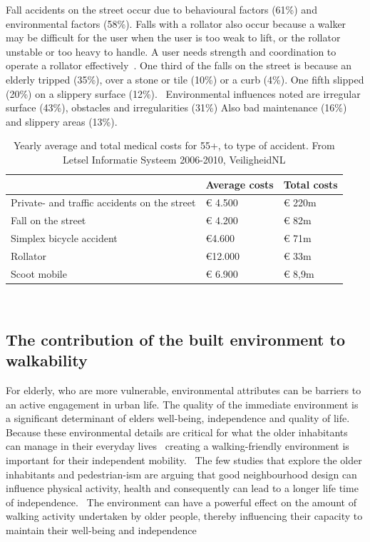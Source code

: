 Fall accidents on the street occur due to behavioural factors (61\%) and environmental factors (58\%). Falls with a rollator also occur because a walker may be difficult for the user when the user is too weak to lift, or the rollator unstable or too heavy to handle. A user needs strength and coordination to operate a rollator effectively~\cite{Einbinder2010, Weiss2014}. One third of the falls on the street is because an elderly tripped (35\%), over a stone or tile (10\%) or a curb (4\%). One fifth slipped (20\%) on a slippery surface (12\%).~\cite{VeiligheidNL2012} 
Environmental influences noted are irregular surface (43\%), obstacles and irregularities (31\%) Also bad maintenance (16\%) and slippery areas (13\%).~\cite{VeiligheidNL2012} 

\renewcommand{\arraystretch}{1.5}
\renewcommand{\tabcolsep}{0.2cm}
\begin{table}[!hbp]
\caption{Yearly average and total medical costs for 55+, to type of accident. From Letsel Informatie Systeem 2006-2010, VeiligheidNL \label{costsaccident} }
\centering
\begin{tabular}{|l|l|l|} 
\hline 
& Average costs & Total costs \\
\hline
Private- and traffic accidents on the street & \euro{} 4.500 & \euro{} 220m \\
Fall on the street & \euro{} 4.200 & \euro{} 82m \\
Simplex bicycle accident & \euro{}4.600 & \euro{} 71m \\ 
Rollator & \euro{}12.000 & \euro{} 33m\\ 
Scoot mobile & \euro{} 6.900 & \euro{} 8,9m \\
\hline
\end{tabular}
~\cite{DenHertog2013}
\end{table}


\subsection{The contribution of the built environment to walkability}
For elderly, who are more vulnerable, environmental attributes can be barriers to an active engagement in urban life. The quality of the immediate environment is a significant determinant of elders well-being, independence and quality of life.~\cite{Vine2012} Because these environmental details are critical for what the older inhabitants can manage in their everyday lives~\cite{Stahl2013, Stahl2008, Clarke2011, Annear2014} creating a walking-friendly environment is important for their independent mobility.~\cite{Sauter2010} The few studies that explore the older inhabitants and pedestrian-ism are arguing that good neighbourhood design can influence physical activity, health and consequently can lead to a longer life time of independence.~\cite{Vine2012, Rantakokko2009, Phillips2013, Beard2009, Rosso2011, Clarke2011}
The environment can have a powerful effect on the amount of walking activity undertaken by older people, thereby influencing their capacity to maintain their well-being and independence~\cite{Vine2012}

